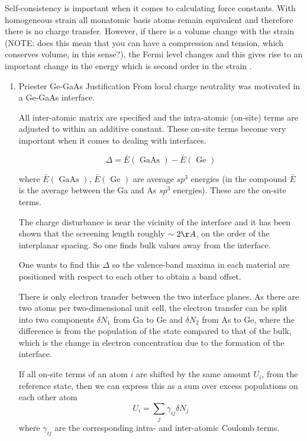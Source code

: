 \documentclass[11pt]{article}
\begin{document}
\begin{enumerate}
\begin{enumerate}
\begin{enumerate}
Self-consistency is important when it comes to calculating force
constants. With homogeneous strain all monatomic basis atoms remain equivalent
and therefore there is no charge transfer. 
However, if there is a volume change with the strain (NOTE: does this mean
that you can have a compression and tension, which conserves volume, in this
sense?), the Fermi level changes
and this gives rise to an important change in the energy which is second order
in the strain \cite{Heine1980}. 

\begin{enumerate}
\item Priester Ge-GaAs Justification
\label{sec:org45de5b8}
From \cite{Priester1986} local charge neutrality was motivated in a Ge-GaAs
interface. 

All inter-atomic matrix are specified and the intra-atomic (on-site) terms are
adjusted to within an additive constant. These on-site terms become very
important when it comes to dealing with interfaces. 

\[
\Delta = \bar{ E }( \text{ GaAs } ) - \bar{ E }( \text{ Ge } )
\]

where \(\bar{ E }( \text{ GaAs } )\), \(\bar{ E }( \text{ Ge } )\) are average \(sp^3\) energies 
(in the compound \(\bar{E}\) is the average between the Ga and As \(sp^3\)
energies). These are the on-site terms. 

The charge disturbance is near the vicinity of the interface and it has been
shown that the screening length roughly \(\sim 2\AA\), on the order of the
interplanar spacing. So one finds bulk values away from the interface. 

One wants to find this \(\Delta\) so the valence-band maxima in each material
are positioned with respect to each other to obtain a band offset. 

There is only electron transfer between the two
interface planes. As there are two atoms per two-dimensional unit cell, the
electron transfer can be split into two components \(\delta N_1\) from Ga to Ge
and \(\delta N_2\) from As to Ge, where the difference is from the population of
the state compared to that of the bulk, which is the change in electron
concentration due to the formation of the interface. 

If all on-site terms of an atom \(i\) are shifted by the same
amount \(U_{i}\), from the reference state, then we can express this as a sum
over excess populations on each other atom
\[
U_{i} = \sum_{j} \gamma_{ij} \delta N_{j}
\] 
where \(\gamma_{ij}\) are the corresponding intra- and inter-atomic Coulomb
terms. 


\end{enumerate}
\end{enumerate}
\end{enumerate}
\end{enumerate}
\end{document}

